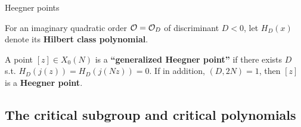 \documentclass[handout]{beamer}
\begin{document}
\begin{frame}{Heegner points}

For an imaginary quadratic order $\mathcal{O} = \mathcal{O}_D$ of discriminant $D < 0$, 
let $H_D(x)$ denote its {\bf Hilbert class polynomial}.

\pause
\smallskip


 

\begin{Def}
A point $[z] \in X_0(N)$ is a {\bf ``generalized Heegner point''} if there exists $D$ s.t.
$H_D(j(z)) = H_D(j(Nz)) = 0$. 
If in addition, $(D,2N) = 1$, then $[z]$ is a {\bf Heegner point}.
\end{Def}
\pause 

\end{frame}


\subsection{The critical subgroup and critical polynomials}
\end{document}
